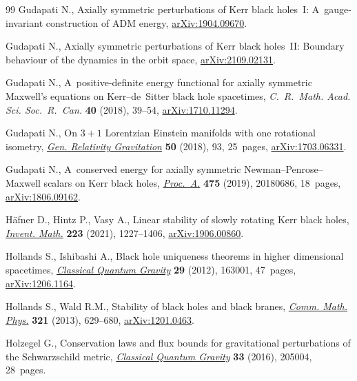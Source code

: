 \documentclass[pdftex]{sigma}
\numberwithin{equation}{section}
\begin{document}
\begin{thebibliography}{99}
Gudapati N., Axially symmetric perturbations of {K}err black holes~{I}:
 {A}~gauge-invariant construction of {ADM} energy,
 \href{http://arxiv.org/abs/1904.09670}{arXiv:1904.09670}.

Gudapati N., Axially symmetric perturbations of {K}err black holes~{II}:
 {B}oundary behaviour of the dynamics in the orbit space,
 \href{http://arxiv.org/abs/2109.02131}{arXiv:2109.02131}.


Gudapati N., A~positive-definite energy functional for axially symmetric
 {M}axwell's equations on {K}err--de~{S}itter black hole spacetimes,
 \textit{C.~R.~Math. Acad. Sci. Soc.~R.~Can.} \textbf{40} (2018), 39--54,
 \href{http://arxiv.org/abs/1710.11294}{arXiv:1710.11294}.

Gudapati N., On {$3+1$} {L}orentzian {E}instein manifolds with one rotational
 isometry, \href{https://doi.org/10.1007/s10714-018-2404-2}{\textit{Gen.
 Relativity Gravitation}} \textbf{50} (2018), 93, 25~pages,
 \href{http://arxiv.org/abs/1703.06331}{arXiv:1703.06331}.

Gudapati N., A~conserved energy for axially symmetric
 {N}ewman--{P}enrose--{M}axwell scalars on {K}err black holes,
 \href{https://doi.org/10.1098/rspa.2018.0686}{\textit{Proc.~A.}} \textbf{475}
 (2019), 20180686, 18~pages,
 \href{http://arxiv.org/abs/1806.09162}{arXiv:1806.09162}.

H\"afner D., Hintz P., Vasy A., Linear stability of slowly rotating {K}err
 black holes,
 \href{https://doi.org/10.1007/s00222-020-01002-4}{\textit{Invent. Math.}}
 \textbf{223} (2021), 1227--1406,
 \href{http://arxiv.org/abs/1906.00860}{arXiv:1906.00860}.

Hollands S., Ishibashi A., Black hole uniqueness theorems in higher dimensional
 spacetimes,
 \href{https://doi.org/10.1088/0264-9381/29/16/163001}{\textit{Classical
 Quantum Gravity}} \textbf{29} (2012), 163001, 47~pages,
 \href{http://arxiv.org/abs/1206.1164}{arXiv:1206.1164}.

Hollands S., Wald R.M., Stability of black holes and black branes,
 \href{https://doi.org/10.1007/s00220-012-1638-1}{\textit{Comm. Math. Phys.}}
 \textbf{321} (2013), 629--680,
 \href{http://arxiv.org/abs/1201.0463}{arXiv:1201.0463}.

Holzegel G., Conservation laws and flux bounds for gravitational perturbations
 of the {S}chwarzschild metric,
 \href{https://doi.org/10.1088/0264-9381/33/20/205004}{\textit{Classical
 Quantum Gravity}} \textbf{33} (2016), 205004, 28~pages.


\end{thebibliography}
\end{document}
